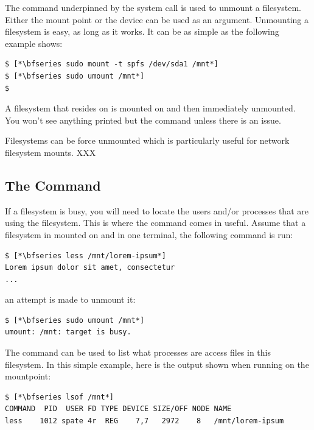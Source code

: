 The  command underpinned by the  system call is used to unmount a filesystem. Either the mount point or the device can be used as an argument. Unmounting a filesystem is easy, as long as it works. It can be as simple as the following example shows:

\begin{lstlisting}
$ [*\bfseries sudo mount -t spfs /dev/sda1 /mnt*]
$ [*\bfseries sudo umount /mnt*]
$
\end{lstlisting}

\noindent
A filesystem that resides on  is mounted on  and then immediately unmounted. You won't see anything printed but the  command unless there is an issue.

Filesystems can be force unmounted which is particularly useful for network filesystem mounts. XXX


\subsection{The  Command}

If a filesystem is busy, you will need to locate the users and/or processes that are using the filesystem. This is where the  command comes in useful. Assume that a filesystem in mounted on  and in one terminal, the following command is run:

\begin{lstlisting}
$ [*\bfseries less /mnt/lorem-ipsum*]
Lorem ipsum dolor sit amet, consectetur
...
\end{lstlisting}

\noindent
an attempt is made to unmount it:

\begin{lstlisting}
$ [*\bfseries sudo umount /mnt*]
umount: /mnt: target is busy.
\end{lstlisting}

\noindent
The  command can be used to list what processes are access files in this filesystem. In this simple example, here is the output shown when running  on the mountpoint:

\begin{lstlisting}
$ [*\bfseries lsof /mnt*]
COMMAND  PID  USER FD TYPE DEVICE SIZE/OFF NODE NAME
less    1012 spate 4r  REG    7,7   2972    8   /mnt/lorem-ipsum
\end{lstlisting}

